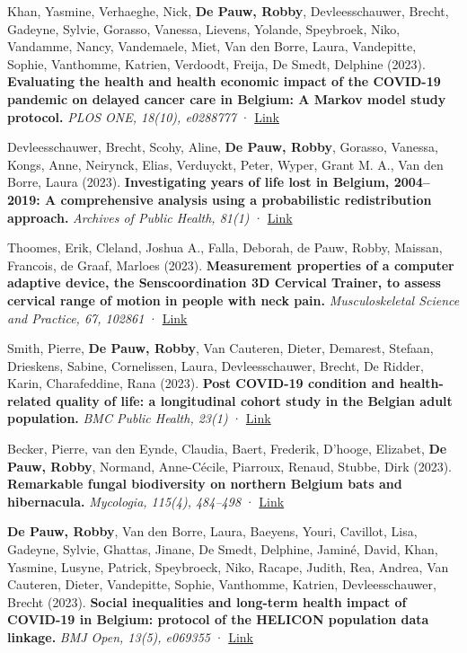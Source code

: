 \documentclass[
  letterpaper,
  DIV=11,
  numbers=noendperiod]{scrartcl}
\begin{document}
Khan, Yasmine, Verhaeghe, Nick, \textbf{De Pauw, Robby},
Devleesschauwer, Brecht, Gadeyne, Sylvie, Gorasso, Vanessa, Lievens,
Yolande, Speybroek, Niko, Vandamme, Nancy, Vandemaele, Miet, Van den
Borre, Laura, Vandepitte, Sophie, Vanthomme, Katrien, Verdoodt, Freija,
De Smedt, Delphine (2023). \textbf{Evaluating the health and health
economic impact of the COVID-19 pandemic on delayed cancer care in
Belgium: A Markov model study protocol.} \emph{PLOS ONE, 18(10),
e0288777} · \href{http://dx.doi.org/10.1371/JOURNAL.PONE.0288777}{Link}

Devleesschauwer, Brecht, Scohy, Aline, \textbf{De Pauw, Robby}, Gorasso,
Vanessa, Kongs, Anne, Neirynck, Elias, Verduyckt, Peter, Wyper, Grant M.
A., Van den Borre, Laura (2023). \textbf{Investigating years of life
lost in Belgium, 2004--2019: A comprehensive analysis using a
probabilistic redistribution approach.} \emph{Archives of Public Health,
81(1)} · \href{http://dx.doi.org/10.1186/S13690-023-01163-7}{Link}

Thoomes, Erik, Cleland, Joshua A., Falla, Deborah, de Pauw, Robby,
Maissan, Francois, de Graaf, Marloes (2023). \textbf{Measurement
properties of a computer adaptive device, the Senscoordination 3D
Cervical Trainer, to assess cervical range of motion in people with neck
pain.} \emph{Musculoskeletal Science and Practice, 67, 102861} ·
\href{http://dx.doi.org/10.1016/J.MSKSP.2023.102861}{Link}

Smith, Pierre, \textbf{De Pauw, Robby}, Van Cauteren, Dieter, Demarest,
Stefaan, Drieskens, Sabine, Cornelissen, Laura, Devleesschauwer, Brecht,
De Ridder, Karin, Charafeddine, Rana (2023). \textbf{Post COVID-19
condition and health-related quality of life: a longitudinal cohort
study in the Belgian adult population.} \emph{BMC Public Health, 23(1)}
· \href{http://dx.doi.org/10.1186/S12889-023-16336-W}{Link}

Becker, Pierre, van den Eynde, Claudia, Baert, Frederik, D'hooge,
Elizabet, \textbf{De Pauw, Robby}, Normand, Anne-Cécile, Piarroux,
Renaud, Stubbe, Dirk (2023). \textbf{Remarkable fungal biodiversity on
northern Belgium bats and hibernacula.} \emph{Mycologia, 115(4),
484--498} · \href{http://dx.doi.org/10.1080/00275514.2023.2213138}{Link}

\textbf{De Pauw, Robby}, Van den Borre, Laura, Baeyens, Youri, Cavillot,
Lisa, Gadeyne, Sylvie, Ghattas, Jinane, De Smedt, Delphine, Jaminé,
David, Khan, Yasmine, Lusyne, Patrick, Speybroeck, Niko, Racape, Judith,
Rea, Andrea, Van Cauteren, Dieter, Vandepitte, Sophie, Vanthomme,
Katrien, Devleesschauwer, Brecht (2023). \textbf{Social inequalities and
long-term health impact of COVID-19 in Belgium: protocol of the HELICON
population data linkage.} \emph{BMJ Open, 13(5), e069355} ·
\href{http://dx.doi.org/10.1136/BMJOPEN-2022-069355}{Link}
\end{document}
